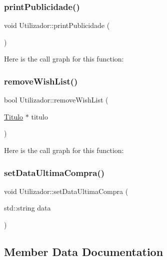 \subsubsection{\texorpdfstring{print\+Publicidade()}{printPublicidade()}}
{\footnotesize\ttfamily void Utilizador\+::print\+Publicidade (\begin{DoxyParamCaption}{ }\end{DoxyParamCaption})}

Here is the call graph for this function\+:
\mbox{\label{class_utilizador_aa47c2fe835a73a23664149ccc7fbc10f}} 
\subsubsection{\texorpdfstring{remove\+Wish\+List()}{removeWishList()}}
{\footnotesize\ttfamily bool Utilizador\+::remove\+Wish\+List (\begin{DoxyParamCaption}\item[{\mbox{\hyperlink{class_titulo}{Titulo}} $\ast$}]{titulo }\end{DoxyParamCaption})}

Here is the call graph for this function\+:
\mbox{\label{class_utilizador_ac3c7ff821739e5682a5d06d0868031ac}} 
\subsubsection{\texorpdfstring{set\+Data\+Ultima\+Compra()}{setDataUltimaCompra()}}
{\footnotesize\ttfamily void Utilizador\+::set\+Data\+Ultima\+Compra (\begin{DoxyParamCaption}\item[{std\+::string}]{data }\end{DoxyParamCaption})\hspace{0.3cm}{\ttfamily [inline]}}



\subsection{Member Data Documentation}
\mbox{\label{class_utilizador_a06fb986d77ace5547f107b6a5ce10c5e}} 
